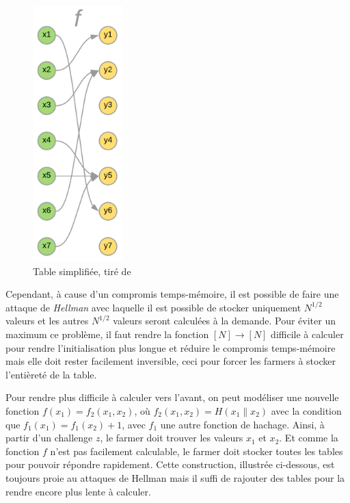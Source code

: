 \begin{figure}[H]
  \centering
  \includegraphics[width=3.5cm]{images/pospace_1.png}
  \caption{Table simplifiée, tiré de \cite{chia:construction}}
\end{figure}

Cependant, à cause d'un compromis temps-mémoire, il est possible de faire une attaque de \emph{Hellman} avec laquelle il est possible de stocker uniquement $N^{1/2}$ valeurs et les autres $N^{1/2}$ valeurs seront calculées à la demande. Pour éviter un maximum ce problème, il faut rendre la fonction $[N] \rightarrow [N]$ difficile à calculer pour rendre l'initialisation plus longue et réduire le compromis temps-mémoire mais elle doit rester facilement inversible, ceci pour forcer les farmers à stocker l'entièreté de la table. \cite{chia:construction}

Pour rendre plus difficile à calculer vers l'avant, on peut modéliser une nouvelle fonction $f(x_1)=f_2(x_1,x_2)$, où $f_2(x_1,x_2)=H(x_1\|x_2)$ avec la condition que $f_1(x_1)=f_1(x_2)+1$, avec $f_1$ une autre fonction de hachage. Ainsi, à partir d'un challenge $z$, le farmer doit trouver les valeurs $x_1$ et $x_2$. Et comme la fonction $f$ n'est pas facilement calculable, le farmer doit stocker toutes les tables pour pouvoir répondre rapidement. Cette construction, illustrée ci-dessous, est toujours proie au attaques de Hellman mais il suffi de rajouter des tables pour la rendre encore plus lente à calculer. \cite{chia:construction}

